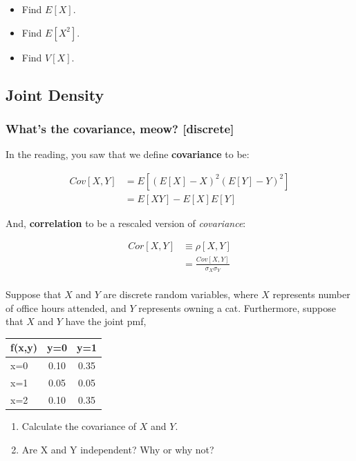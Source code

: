 \documentclass[
]{book}
\providecommand{\tightlist}{%
  \setlength{\itemsep}{0pt}\setlength{\parskip}{0pt}}
\theoremstyle{definition}
\theoremstyle{definition}
\theoremstyle{definition}
\theoremstyle{definition}
\theoremstyle{remark}
\begin{document}
\begin{itemize}
\tightlist
\item
  Find \(E[X]\).
\item
  Find \(E[X^2]\).
\item
  Find \(V[X]\).
\end{itemize}

\hypertarget{joint-density-1}{%
\subsection{Joint Density}\label{joint-density-1}}

\hypertarget{whats-the-covariance-meow-discrete}{%
\subsubsection{What's the covariance, meow? {[}discrete{]}}\label{whats-the-covariance-meow-discrete}}

In the reading, you saw that we define \textbf{covariance} to be:

\[
\begin{aligned}
Cov[X,Y]    &= E[(E[X] - X)^{2}(E[Y] - Y)^{2}] \\ 
            &= E[XY] - E[X]E[Y]
\end{aligned} 
\]

And, \textbf{correlation} to be a rescaled version of \emph{covariance}:

\[
\begin{aligned}
Cor[X,Y]    & \equiv \rho[X,Y] \\ 
            & = \frac{Cov[X,Y]}{\sigma_{X}\sigma_{Y}} \\
\end{aligned}            
\]

Suppose that \(X\) and \(Y\) are discrete random variables, where \(X\) represents number of office hours attended, and \(Y\) represents owning a cat. Furthermore, suppose that \(X\) and \(Y\) have the joint pmf,

\begin{longtable}[]{@{}lcc@{}}
\toprule\noalign{}
f(x,y) & y=0 & y=1 \\
\midrule\noalign{}
\endhead
\bottomrule\noalign{}
\endlastfoot
x=0 & 0.10 & 0.35 \\
x=1 & 0.05 & 0.05 \\
x=2 & 0.10 & 0.35 \\
\end{longtable}

\begin{enumerate}
\def\labelenumi{\arabic{enumi}.}
\tightlist
\item
  Calculate the covariance of \(X\) and \(Y\).
\item
  Are X and Y independent? Why or why not?
\end{enumerate}
\end{document}
